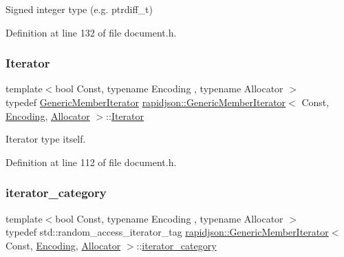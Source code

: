 Signed integer type (e.\+g. {\ttfamily ptrdiff\+\_\+t}) 



Definition at line 132 of file document.\+h.

\mbox{\label{classrapidjson_1_1_generic_member_iterator_a37091c3dd8470486ef5188f3c1108653}} 
\subsubsection{\texorpdfstring{Iterator}{Iterator}}
{\footnotesize\ttfamily template$<$bool Const, typename Encoding , typename Allocator $>$ \\
typedef \mbox{\hyperlink{classrapidjson_1_1_generic_member_iterator}{Generic\+Member\+Iterator}} \mbox{\hyperlink{classrapidjson_1_1_generic_member_iterator}{rapidjson\+::\+Generic\+Member\+Iterator}}$<$ Const, \mbox{\hyperlink{classrapidjson_1_1_encoding}{Encoding}}, \mbox{\hyperlink{classrapidjson_1_1_allocator}{Allocator}} $>$\+::\mbox{\hyperlink{classrapidjson_1_1_generic_member_iterator_a37091c3dd8470486ef5188f3c1108653}{Iterator}}}



Iterator type itself. 



Definition at line 112 of file document.\+h.

\mbox{\label{classrapidjson_1_1_generic_member_iterator_a38b75fd16d115b5230b373207ac05b27}} 
\subsubsection{\texorpdfstring{iterator\_category}{iterator\_category}}
{\footnotesize\ttfamily template$<$bool Const, typename Encoding , typename Allocator $>$ \\
typedef std\+::random\+\_\+access\+\_\+iterator\+\_\+tag \mbox{\hyperlink{classrapidjson_1_1_generic_member_iterator}{rapidjson\+::\+Generic\+Member\+Iterator}}$<$ Const, \mbox{\hyperlink{classrapidjson_1_1_encoding}{Encoding}}, \mbox{\hyperlink{classrapidjson_1_1_allocator}{Allocator}} $>$\+::\mbox{\hyperlink{classrapidjson_1_1_generic_member_iterator_a38b75fd16d115b5230b373207ac05b27}{iterator\+\_\+category}}}



